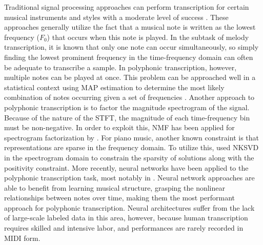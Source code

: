 Traditional signal processing approaches can perform transcription for certain musical instruments and styles with a moderate level of success \cite{klapuri_signal_2004} . These approaches generally utilize the fact that a musical note is written as the lowest frequency ($F_0$) that occurs when this note is played. In the subtask of melody transcription, it is known that only one note can occur simultaneously, so simply finding the lowest prominent frequency in the time-frequency domain can often be adequate to transcribe a sample. In polyphonic transcription, however, multiple notes can be played at once. This problem can be approached well in a statistical context using \ac{MAP} estimation to determine the most likely combination of notes occurring given a set of frequencies \cite{emiya_multipitch_2010}. Another approach to polyphonic transcription is to factor the magnitude spectrogram of the signal. Because of the nature of the \ac{STFT}, the magnitude of each time-frequency bin must be non-negative. In order to exploit this, \ac{NMF} has been applied for spectrogram factorization by \cite{smaragdis_non-negative_2003}. For piano music, another known constraint is that representations are sparse in the frequency domain. To utilize this, \cite{bertin_blind_2007} used \ac{NKSVD} in the spectrogram domain to constrain the sparsity of solutions along with the positivity constraint. More recently, neural networks have been applied to the polyphonic transcription task, most notably in \cite{hawthorne_onsets_2018}. Neural network approaches are able to benefit from learning musical structure, grasping the nonlinear relationships between notes over time, making them the most performant approach for polyphonic transcription. Neural architectures suffer from the lack of large-scale labeled data in this area, however, because human transcription requires skilled and intensive labor, and performances are rarely recorded in \ac{MIDI} form.
